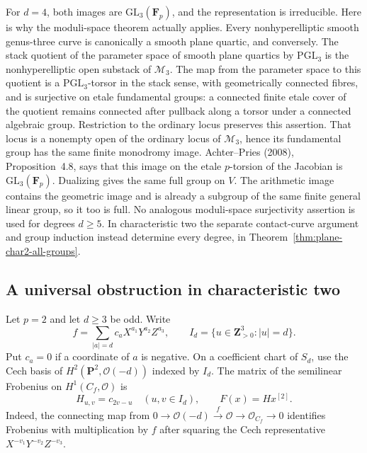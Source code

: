 For $d=4$, both images are $\mathrm{GL}_3(\mathbf F_p)$, and the
representation is irreducible.  Here is why the moduli-space theorem
actually applies.  Every nonhyperelliptic smooth genus-three curve is
canonically a smooth plane quartic, and conversely.  The stack quotient
of the parameter space of smooth plane quartics by $\mathrm{PGL}_3$
is the nonhyperelliptic open substack of $\mathcal M_3$.
The map from the parameter space to this quotient is a
$\mathrm{PGL}_3$-torsor in the stack sense, with geometrically connected
fibres, and is surjective on etale fundamental groups: a connected
finite etale cover of the quotient remains connected after pullback
along a torsor under a connected algebraic group.  Restriction to
the ordinary locus preserves this assertion.  That locus is a
nonempty open of the ordinary locus of $\mathcal M_3$, hence its
fundamental group has the same finite monodromy image.
Achter--Pries (2008), Proposition~4.8, says that this image on the
etale $p$-torsion of the Jacobian is $\mathrm{GL}_3(\mathbf F_p)$.
Dualizing gives the same full group on $V$.
The arithmetic image contains the geometric image and is already
a subgroup of the same finite general linear group, so it too is full.
No analogous moduli-space surjectivity assertion is used for degrees
$d\geq5$.  In characteristic two the separate contact-curve argument
and group induction instead determine every degree, in
Theorem~\ref{thm:plane-char2-all-groups}.

\subsection{A universal obstruction in characteristic two}
\label{subsec:odd-plane-obstruction}

Let $p=2$ and let $d\geq3$ be odd.  Write
\[
 f=\sum_{|a|=d}c_aX^{a_1}Y^{a_2}Z^{a_3},\qquad
 I_d=\{u\in\mathbf Z_{>0}^3:|u|=d\}.
\]
Put $c_a=0$ if a coordinate of $a$ is negative.  On a coefficient
chart of $S_d$, use the Cech basis of
$H^2(\mathbf P^2,\mathcal O(-d))$ indexed by $I_d$.
The matrix of the semilinear Frobenius on $H^1(C_f,\mathcal O)$ is
\begin{equation}\label{eq:plane-hw-char2}
 H_{u,v}=c_{2v-u}\quad(u,v\in I_d),\qquad F(x)=Hx^{[2]}.
\end{equation}
Indeed, the connecting map from
$0\to\mathcal O(-d)\xrightarrow{f}\mathcal O\to\mathcal O_{C_f}\to0$
identifies Frobenius with multiplication by $f$ after squaring the
Cech representative $X^{-v_1}Y^{-v_2}Z^{-v_3}$.

